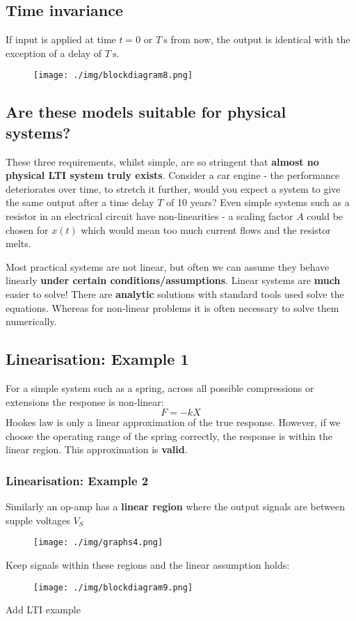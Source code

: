 \subsection{Time invariance}
If input is applied at time $t=0$ or $T \ \si{\second}$ from now, the output is identical with the exception of a delay of $T \ \si{\second}$.
\begin{figure}[H]
  \centering
  \texttt{[image: ./img/blockdiagram8.png]}
\end{figure}
\subsection*{Are these models suitable for physical systems?}
These three requirements, whilst simple, are so stringent that \textbf{almost no physical LTI system truly exists}. Consider a car engine - the performance deteriorates over time, to stretch it further, would you expect a system to give the same output after a time delay $T$ of 10 years? Even simple systems such as a resistor in an electrical circuit have non-linearities - a scaling factor $A$ could be chosen for $x(t)$ which would mean too much current flows and the resistor melts.

Most practical systems are not linear, but often we can assume they behave linearly \textbf{under certain conditions/assumptions}. Linear systems are \textbf{much} easier to solve! There are \textbf{analytic} solutions with standard tools used solve the equations. Whereas for non-linear problems it is often necessary to solve them numerically.
\subsection{Linearisation: Example 1}
For a simple system such as a spring, across all possible compressions or extensions the response is non-linear:
\begin{equation}
  F = -kX
\end{equation}
Hookes law is only a linear approximation of the true response. However, if we choose the operating range of the spring correctly, the response is within the linear region. This approximation is \textbf{valid}.
\subsubsection{Linearisation: Example 2}
Similarly an op-amp has a \textbf{linear region} where the output signals are between supple voltages $V_S$
\begin{figure}[H]
  \centering
  \texttt{[image: ./img/graphs4.png]}
\end{figure}
Keep signals within these regions and the linear assumption holds:
\begin{figure}[H]
  \centering
  \texttt{[image: ./img/blockdiagram9.png]}
\end{figure}
Add LTI example
